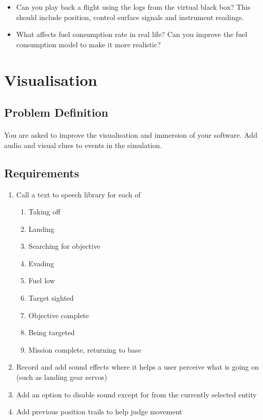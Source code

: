 \documentclass[11pt]{book}
\begin{document}
\begin{itemize}
\item Can you play back a flight using the logs from the virtual black box? This should include position, control surface signals and instrument readings.
\item What affects fuel consumption rate in real life? Can you improve the fuel consumption model to make it more realistic?
\end{itemize}

\clearpage

\section{Visualisation}

\subsection{Problem Definition}

\paragraph{} You are asked to improve the visualisation and immersion of your software. Add audio and visual clues to events in the simulation.

\subsection{Requirements}

\begin{enumerate}
\item Call a text to speech library for each of
    \begin{enumerate}
    \item Taking off
    \item Landing
    \item Searching for objective
    \item Evading
    \item Fuel low
    \item Target sighted
    \item Objective complete
    \item Being targeted
    \item Mission complete, returning to base
    \end{enumerate}
\item Record and add sound effects where it helps a user perceive what is going on (such as landing gear servos)
\item Add an option to disable sound except for from the currently selected entity
\item Add previous position trails to help judge movement
\end{enumerate}
\end{document}
